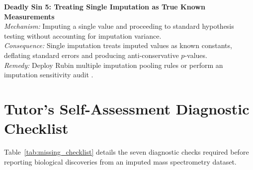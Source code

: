 \documentclass[11pt,oneside]{book}
\begin{document}
\begin{pitfallbox}
\textbf{Deadly Sin 5: Treating Single Imputation as True Known Measurements}\\
\textit{Mechanism:} Imputing a single value and proceeding to standard hypothesis testing without accounting for imputation variance.\\
\textit{Consequence:} Single imputation treats imputed values as known constants, deflating standard errors and producing anti-conservative $p$-values.\\
\textit{Remedy:} Deploy Rubin multiple imputation pooling rules or perform an imputation sensitivity audit \cite{rubin1987multiple, barnard1999small}.
\end{pitfallbox}

\section{Tutor's Self-Assessment Diagnostic Checklist}

Table~\ref{tab:missing_checklist} details the seven diagnostic checks required before reporting biological discoveries from an imputed mass spectrometry dataset.
\end{document}
